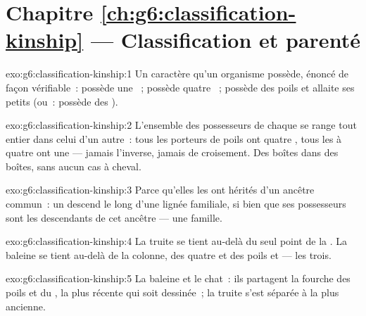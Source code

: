 \section*{Chapitre \ref{ch:g6:classification-kinship} --- Classification et parenté}

\begin{solution}{exo:g6:classification-kinship:1}
Un caractère qu'un organisme possède, énoncé de façon vérifiable~:
possède une ~; possède quatre ~; possède
des poils et allaite ses petits (ou~: possède des ).
\end{solution}

\begin{solution}{exo:g6:classification-kinship:2}
L'ensemble des possesseurs de chaque  se range tout entier
dans celui d'un autre~: tous les porteurs de poils ont quatre
, tous les  à quatre  ont une  --- jamais l'inverse, jamais de croisement. Des boîtes
dans des boîtes, sans aucun cas à cheval.
\end{solution}

\begin{solution}{exo:g6:classification-kinship:3}
Parce qu'elles les ont hérités d'un ancêtre commun~: un 
descend le long d'une lignée familiale, si bien que ses possesseurs
sont les descendants de cet ancêtre --- une famille.
\end{solution}

\begin{solution}{exo:g6:classification-kinship:4}
La truite se tient au-delà du seul point de la .
La baleine se tient au-delà de la colonne, des quatre  et des
poils et  --- les trois.
\end{solution}

\begin{solution}{exo:g6:classification-kinship:5}
La baleine et le chat~: ils partagent la fourche des poils et du
, la plus récente qui soit dessinée~; la truite s'est séparée à
la plus ancienne.
\end{solution}

